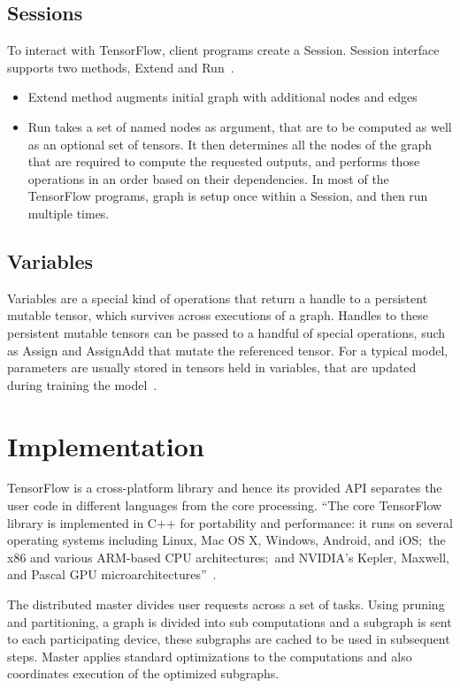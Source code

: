 \subsection*{Sessions}

To interact with TensorFlow, client programs create a Session. Session
interface supports two methods, Extend and Run~\cite{hid-sp18-510-notes}. 
\begin{itemize} 
	\item Extend method augments initial graph with additional nodes and edges
	\item Run takes a set of named nodes as argument, that are to be
computed as well as an optional set of tensors. It then determines all
the nodes of the graph that are required to compute the requested
outputs, and performs those operations in an order based on their
dependencies. In most of the TensorFlow programs, graph is setup once
within a Session, and then run multiple times. 
\end{itemize}

\subsection*{Variables} 
Variables are a special kind of operations
that return a handle to a persistent mutable tensor, which survives
across executions of a graph. Handles to these persistent mutable
tensors can be passed to a handful of special operations, such as
Assign and AssignAdd that mutate the referenced tensor. For a typical
model, parameters are usually stored in tensors held in variables,
that are updated during training the model~\cite{hid-sp18-510-notes}.

\section{Implementation}
TensorFlow is a cross-platform library and hence its provided API
separates the user code in different languages from the core
processing. ``The core TensorFlow library is implemented in C++ for
portability and performance: it runs on several operating systems
including Linux, Mac OS X, Windows, Android, and iOS;~the x86 and
various ARM-based CPU architectures;~and NVIDIA's Kepler, Maxwell, and
Pascal GPU microarchitectures''~\cite{hid-sp18-510-tensorflow-whitepaper-2}. 

The distributed master divides user requests across a set of tasks. Using
pruning and partitioning, a graph is divided into sub computations and
a subgraph is sent to each participating device, these subgraphs are
cached to be used in subsequent steps. Master applies standard
optimizations to the computations and also coordinates execution of
the optimized subgraphs. 

